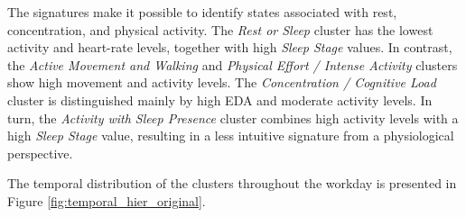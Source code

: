 \documentclass[a4paper,fleqn]{cas-sc}
\begin{document}
\begin{center}
\label{tab:percentis_hier_original}
\renewcommand{\arraystretch}{1.4}
\end{center}

The signatures make it possible to identify states associated with rest, concentration, and physical activity. The \textit{Rest or Sleep} cluster has the lowest activity and heart-rate levels, together with high \textit{Sleep Stage} values. In contrast, the \textit{Active Movement and Walking} and \textit{Physical Effort / Intense Activity} clusters show high movement and activity levels. The \textit{Concentration / Cognitive Load} cluster is distinguished mainly by high EDA and moderate activity levels. In turn, the \textit{Activity with Sleep Presence} cluster combines high activity levels with a high \textit{Sleep Stage} value, resulting in a less intuitive signature from a physiological perspective.

The temporal distribution of the clusters throughout the workday is presented in Figure \ref{fig:temporal_hier_original}.
\end{document}
